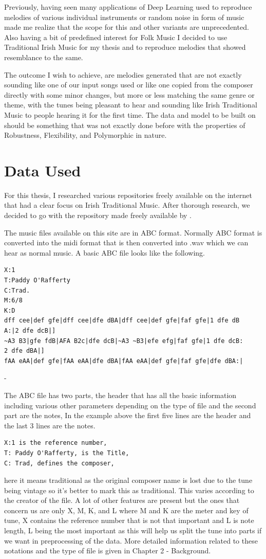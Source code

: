 \documentclass[oneside,12pt]{Classes/RoboticsLaTeX}
\begin{document}
Previously, having seen many applications of Deep Learning used to reproduce melodies of various individual instruments or random noise in form of music made me realize that the scope for this and other variants are unprecedented. Also having a bit of predefined interest for Folk Music I decided to use Traditional Irish Music for my thesis and to reproduce melodies that showed resemblance to the same.

The outcome I wish to achieve, are melodies generated that are not exactly sounding like one of our input songs used or like one copied from the composer directly with some minor changes, but more or less matching the same genre or theme, with the tunes being pleasant to hear and sounding like Irish Traditional Music to people hearing it for the first time. The data and model to be built on should be something that was not exactly done before with the properties of Robustness, Flexibility, and Polymorphic in nature.

\section{Data Used}
For this thesis, I researched various repositories freely available on the internet that had a clear focus on Irish Traditional Music. After thorough research, we decided to go with the repository made freely available by \cite{session}.

The music files available on this site are in ABC format. Normally ABC format is converted into the midi format that is then converted into .wav which we can hear as normal music. A basic ABC file looks like the following.
\begin{verbatim}
X:1
T:Paddy O'Rafferty  
C:Trad.  
M:6/8  
K:D  
dff cee|def gfe|dff cee|dfe dBA|dff cee|def gfe|faf gfe|1 dfe dB
A:|2 dfe dcB|]  
~A3 B3|gfe fdB|AFA B2c|dfe dcB|~A3 ~B3|efe efg|faf gfe|1 dfe dcB:
2 dfe dBA|]  
fAA eAA|def gfe|fAA eAA|dfe dBA|fAA eAA|def gfe|faf gfe|dfe dBA:|
\end{verbatim}
-\cite{abcnotation}

The ABC file has two parts, the header that has all the basic information including various other parameters depending on the type of file and the second part are the notes, In the example above the first five lines are the header and the last 3 lines are the notes.
\begin{verbatim}
X:1 is the reference number,
T: Paddy O'Rafferty, is the Title, 
C: Trad, defines the composer,
\end{verbatim}here it means traditional as the original composer name is lost due to the tune being vintage so it's better to mark this as traditional. This varies according to the creator of the file.
A lot of other features are present but the ones that concern us are only X, M, K, and L where M and K are the meter and key of tune, X contains the reference number that is not that important and L is note length, L being the most important as this will help us split the tune into parts if we want in preprocessing of the data.
More detailed information related to these notations and the type of file is given in Chapter 2 - Background.
\end{document}

